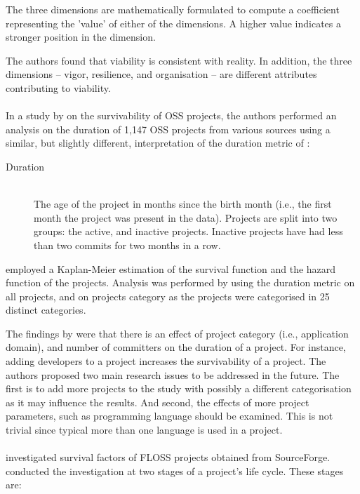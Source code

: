 The three dimensions are mathematically formulated to compute a coefficient
representing the 'value' of either of the dimensions. A higher value indicates
a stronger position in the dimension.

The authors found that viability is consistent with reality. In addition, the
three dimensions -- vigor, resilience, and organisation -- are different
attributes contributing to viability.

\paragraph{}
In a study by \citet{samoladas2010} on the survivability of OSS projects,
the authors performed an analysis on the duration of 1,147 OSS projects from
various sources using a similar, but slightly different, interpretation of the
duration metric of \citet{beecher}:

\begin{description}
	\item[Duration] \hfill \\ The age of the project in months since the birth
		month (i.e., the first month the project was present in the data). Projects
		are split into two groups: the active, and inactive projects. Inactive
		projects have had less than two commits for two months in a row.
\end{description}

\noindent
\citeauthor{samoladas2010} employed a Kaplan-Meier estimation of the survival
function and the hazard function of the projects. Analysis was performed by
using the duration metric on all projects, and on projects category as the
projects were categorised in 25 distinct categories.

The findings by \citeauthor{samoladas2010} were that there is an effect of
project category (i.e., application domain), and number of committers on the
duration of a project. For instance, adding developers to a project increases
the survivability of a project. The authors proposed two main research issues to
be addressed in the future. The first is to add more projects to the study with
possibly a different categorisation as it may influence the results. And second,
the effects of more project parameters, such as programming language should be
examined. This is not trivial since typical more than one language is used in a
project.

\paragraph{}
\citet{wang2012} investigated survival factors of FLOSS projects obtained from
SourceForge. \citeauthor{wang2012} conducted the investigation at two stages
of a project's life cycle. These stages are:

